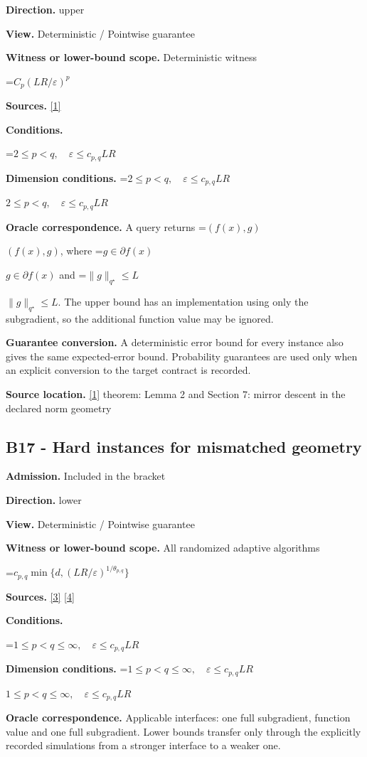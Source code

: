 \documentclass[10pt,a4paper]{article}
\newcommand{\AtlasMath}[1]{\par\begingroup\centering\setbox0=\hbox{$\displaystyle #1$}\ifdim\wd0>1.4\linewidth\typeout{ATLAS WIDE FORMULA: \the\wd0}\fi\ifdim\wd0>\linewidth\resizebox{\linewidth}{!}{\box0}\else\box0\fi\par\endgroup}
\newcommand{\AtlasInlineMath}[1]{\begingroup\setbox0=\hbox{$#1$}\ifdim\wd0>.4\linewidth\endgroup\AtlasMath{#1}\else\endgroup$#1$\fi}
\begin{document}
\textbf{Direction.} upper

\textbf{View.} Deterministic / Pointwise guarantee

\textbf{Witness or lower-bound scope.} Deterministic witness

\AtlasMath{C_p(LR/\varepsilon)^p}
\textbf{Sources.} \href{https://arxiv.org/pdf/1107.4080}{[1]}

\textbf{Conditions.} 
\AtlasMath{2\le p<q,\quad\varepsilon\le c_{p,q}LR}


\textbf{Dimension conditions.} \AtlasInlineMath{2\le p<q,\quad\varepsilon\le c_{p,q}LR}

\textbf{Oracle correspondence.} A query returns \AtlasInlineMath{(f(x),g)}, where \AtlasInlineMath{g\in\partial f(x)} and \AtlasInlineMath{\|g\|_{q^\star}\le L}. The upper bound has an implementation using only the subgradient, so the additional function value may be ignored.

\textbf{Guarantee conversion.} A deterministic error bound for every instance also gives the same expected-error bound. Probability guarantees are used only when an explicit conversion to the target contract is recorded.

\textbf{Source location.} \href{https://arxiv.org/pdf/1107.4080}{[1]} theorem: Lemma 2 and Section 7: mirror descent in the declared norm geometry

\subsection{B17 - Hard instances for mismatched geometry}
\textbf{Admission.} Included in the bracket

\textbf{Direction.} lower

\textbf{View.} Deterministic / Pointwise guarantee

\textbf{Witness or lower-bound scope.} All randomized adaptive algorithms

\AtlasMath{c_{p,q}\min\{d,(LR/\varepsilon)^{1/\theta_{p,q}}\}}
\textbf{Sources.} \href{https://arxiv.org/pdf/2609.20701}{[3]} \href{https://arxiv.org/pdf/2609.20687}{[4]}

\textbf{Conditions.} 
\AtlasMath{1\le p<q\le\infty,\quad\varepsilon\le c_{p,q}LR}


\textbf{Dimension conditions.} \AtlasInlineMath{1\le p<q\le\infty,\quad\varepsilon\le c_{p,q}LR}

\textbf{Oracle correspondence.} Applicable interfaces: one full subgradient, function value and one full subgradient. Lower bounds transfer only through the explicitly recorded simulations from a stronger interface to a weaker one.
\end{document}
